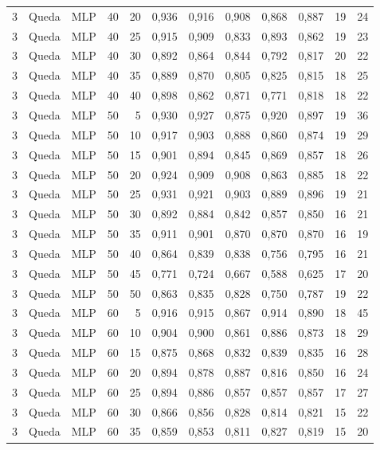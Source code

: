 \begin{longtable}{@{}rllrrrrrrrrr@{}}
3 & Queda & MLP & 40 & 20 & 0,936 & 0,916 & 0,908 & 0,868 & 0,887 & 19 & 24 \\
3 & Queda & MLP & 40 & 25 & 0,915 & 0,909 & 0,833 & 0,893 & 0,862 & 19 & 23 \\
3 & Queda & MLP & 40 & 30 & 0,892 & 0,864 & 0,844 & 0,792 & 0,817 & 20 & 22 \\
3 & Queda & MLP & 40 & 35 & 0,889 & 0,870 & 0,805 & 0,825 & 0,815 & 18 & 25 \\
3 & Queda & MLP & 40 & 40 & 0,898 & 0,862 & 0,871 & 0,771 & 0,818 & 18 & 22 \\
3 & Queda & MLP & 50 & 5 & 0,930 & 0,927 & 0,875 & 0,920 & 0,897 & 19 & 36 \\
3 & Queda & MLP & 50 & 10 & 0,917 & 0,903 & 0,888 & 0,860 & 0,874 & 19 & 29 \\
3 & Queda & MLP & 50 & 15 & 0,901 & 0,894 & 0,845 & 0,869 & 0,857 & 18 & 26 \\
3 & Queda & MLP & 50 & 20 & 0,924 & 0,909 & 0,908 & 0,863 & 0,885 & 18 & 22 \\
3 & Queda & MLP & 50 & 25 & 0,931 & 0,921 & 0,903 & 0,889 & 0,896 & 19 & 21 \\
3 & Queda & MLP & 50 & 30 & 0,892 & 0,884 & 0,842 & 0,857 & 0,850 & 16 & 21 \\
3 & Queda & MLP & 50 & 35 & 0,911 & 0,901 & 0,870 & 0,870 & 0,870 & 16 & 19 \\
3 & Queda & MLP & 50 & 40 & 0,864 & 0,839 & 0,838 & 0,756 & 0,795 & 16 & 21 \\
3 & Queda & MLP & 50 & 45 & 0,771 & 0,724 & 0,667 & 0,588 & 0,625 & 17 & 20 \\
3 & Queda & MLP & 50 & 50 & 0,863 & 0,835 & 0,828 & 0,750 & 0,787 & 19 & 22 \\
3 & Queda & MLP & 60 & 5 & 0,916 & 0,915 & 0,867 & 0,914 & 0,890 & 18 & 45 \\
3 & Queda & MLP & 60 & 10 & 0,904 & 0,900 & 0,861 & 0,886 & 0,873 & 18 & 29 \\
3 & Queda & MLP & 60 & 15 & 0,875 & 0,868 & 0,832 & 0,839 & 0,835 & 16 & 28 \\
3 & Queda & MLP & 60 & 20 & 0,894 & 0,878 & 0,887 & 0,816 & 0,850 & 16 & 24 \\
3 & Queda & MLP & 60 & 25 & 0,894 & 0,886 & 0,857 & 0,857 & 0,857 & 17 & 27 \\
3 & Queda & MLP & 60 & 30 & 0,866 & 0,856 & 0,828 & 0,814 & 0,821 & 15 & 22 \\
3 & Queda & MLP & 60 & 35 & 0,859 & 0,853 & 0,811 & 0,827 & 0,819 & 15 & 20 \\

\end{longtable}
